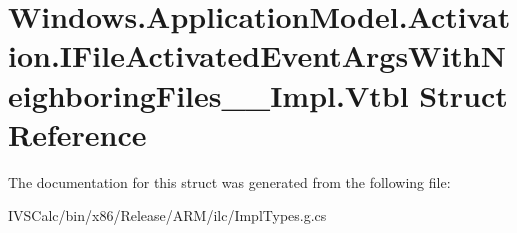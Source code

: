\hypertarget{struct_windows_1_1_application_model_1_1_activation_1_1_i_file_activated_event_args_with_neighboring_files_____impl_1_1_vtbl}{}\section{Windows.\+Application\+Model.\+Activation.\+I\+File\+Activated\+Event\+Args\+With\+Neighboring\+Files\+\_\+\+\_\+\+Impl.\+Vtbl Struct Reference}
\label{struct_windows_1_1_application_model_1_1_activation_1_1_i_file_activated_event_args_with_neighboring_files_____impl_1_1_vtbl}


The documentation for this struct was generated from the following file\+:\begin{DoxyCompactItemize}
\item 
I\+V\+S\+Calc/bin/x86/\+Release/\+A\+R\+M/ilc/Impl\+Types.\+g.\+cs\end{DoxyCompactItemize}
